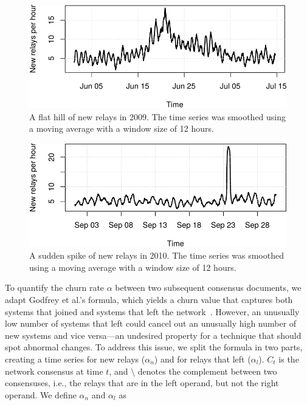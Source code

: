\begin{figure}[t]
	\centering
	\includegraphics[width=\linewidth]{diagrams/flat-hill.pdf}
	\caption{A flat hill of new relays in 2009.  The time series was smoothed
	using a moving average with a window size of 12 hours.}
	\label{fig:flat-hill}
\end{figure}

\begin{figure}[t]
	\centering
	\includegraphics[width=\linewidth]{diagrams/sudden-spike.pdf}
	\caption{A sudden spike of new relays in 2010.  The time series was smoothed
	using a moving average with a window size of 12 hours.}
	\label{fig:sudden-spike}
\end{figure}

To quantify the churn rate $\alpha$ between two subsequent consensus documents,
we adapt Godfrey et al.'s formula, which yields a churn value that captures both
systems that joined and systems that left the network~\cite{Godfrey2006a}.
However, an unusually low number of systems that left could cancel out an
unusually high number of new systems and vice versa---an undesired property for
a technique that should spot abnormal changes.  To address this issue, we split
the formula in two parts, creating a time series for new relays ($\alpha_{n}$)
and for relays that left ($\alpha_{l}$).  $C_{t}$ is the network consensus at
time $t$, and $\setminus$ denotes the complement between two consensuses, i.e.,
the relays that are in the left operand, but not the right operand.  We define
$\alpha_{n}$ and $\alpha_{l}$ as

